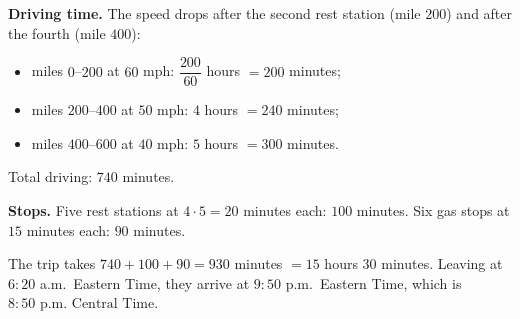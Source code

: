 \textbf{Driving time.} The speed drops after the second rest station (mile $200$) and after the fourth (mile $400$):
\begin{itemize}
\item miles $0$--$200$ at $60$ mph: $\dfrac{200}{60}$ hours $=200$ minutes;
\item miles $200$--$400$ at $50$ mph: $4$ hours $=240$ minutes;
\item miles $400$--$600$ at $40$ mph: $5$ hours $=300$ minutes.
\end{itemize}
Total driving: $740$ minutes.

\textbf{Stops.} Five rest stations at $4\cdot5=20$ minutes each: $100$ minutes. Six gas stops at $15$ minutes each: $90$ minutes.

The trip takes $740+100+90=930$ minutes $=15$ hours $30$ minutes. Leaving at $6{:}20$ a.m.\ Eastern Time, they arrive at $9{:}50$ p.m.\ Eastern Time, which is $\boxed{8{:}50\text{ p.m. Central Time}}$.
